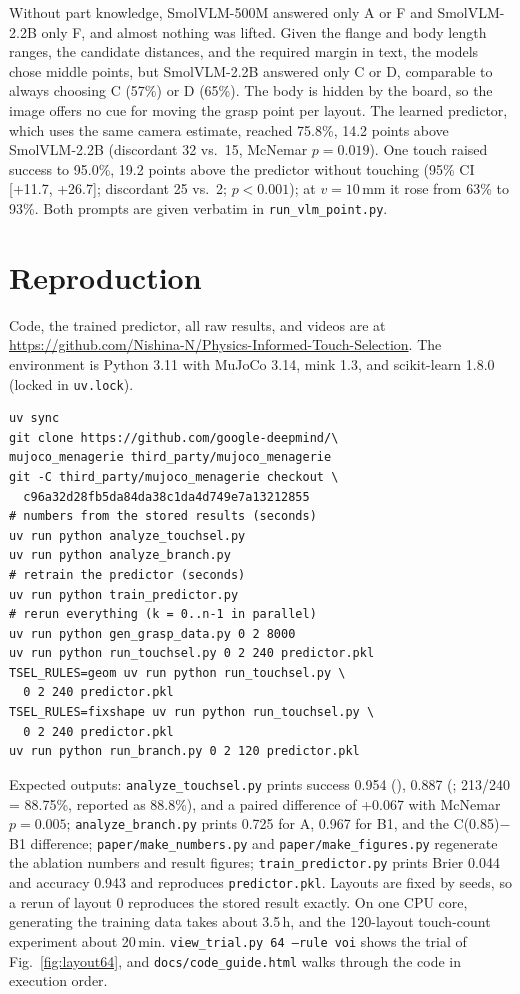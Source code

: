 Without part knowledge, SmolVLM-500M answered only A or F and SmolVLM-2.2B only F, and almost nothing was lifted. Given the flange and body length ranges, the candidate distances, and the required margin in text, the models chose middle points, but SmolVLM-2.2B answered only C or D, comparable to always choosing C (57\%) or D (65\%). The body is hidden by the board, so the image offers no cue for moving the grasp point per layout. The learned predictor, which uses the same camera estimate, reached 75.8\%, 14.2 points above SmolVLM-2.2B (discordant 32 vs.\ 15, McNemar $p=0.019$). One touch raised success to 95.0\%, 19.2 points above the predictor without touching (95\% CI [+11.7, +26.7]; discordant 25 vs.\ 2; $p<0.001$); at $v=10$\,mm it rose from 63\% to 93\%. Both prompts are given verbatim in \texttt{run\_vlm\_point.py}.

\section{Reproduction}\label{app:repro}
Code, the trained predictor, all raw results, and videos are at \url{https://github.com/Nishina-N/Physics-Informed-Touch-Selection}. The environment is Python 3.11 with MuJoCo 3.14, mink 1.3, and scikit-learn 1.8.0 (locked in \texttt{uv.lock}).
\begin{footnotesize}
\begin{verbatim}
uv sync
git clone https://github.com/google-deepmind/\
mujoco_menagerie third_party/mujoco_menagerie
git -C third_party/mujoco_menagerie checkout \
  c96a32d28fb5da84da38c1da4d749e7a13212855
# numbers from the stored results (seconds)
uv run python analyze_touchsel.py
uv run python analyze_branch.py
# retrain the predictor (seconds)
uv run python train_predictor.py
# rerun everything (k = 0..n-1 in parallel)
uv run python gen_grasp_data.py 0 2 8000
uv run python run_touchsel.py 0 2 240 predictor.pkl
TSEL_RULES=geom uv run python run_touchsel.py \
  0 2 240 predictor.pkl
TSEL_RULES=fixshape uv run python run_touchsel.py \
  0 2 240 predictor.pkl
uv run python run_branch.py 0 2 120 predictor.pkl
\end{verbatim}
\end{footnotesize}
Expected outputs: \texttt{analyze\_touchsel.py} prints success 0.954 (\Ours), 0.887 (\Unc; 213/240 = 88.75\%, reported as 88.8\%), and a paired difference of +0.067 with McNemar $p=0.005$; \texttt{analyze\_branch.py} prints 0.725 for A, 0.967 for B1, and the C(0.85)$-$B1 difference; \texttt{paper/make\_numbers.py} and \texttt{paper/make\_figures.py} regenerate the ablation numbers and result figures; \texttt{train\_predictor.py} prints Brier 0.044 and accuracy 0.943 and reproduces \texttt{predictor.pkl}. Layouts are fixed by seeds, so a rerun of layout 0 reproduces the stored result exactly. On one CPU core, generating the training data takes about 3.5\,h, and the 120-layout touch-count experiment about 20\,min. \texttt{view\_trial.py 64 --rule voi} shows the trial of Fig.~\ref{fig:layout64}, and \texttt{docs/code\_guide.html} walks through the code in execution order.
